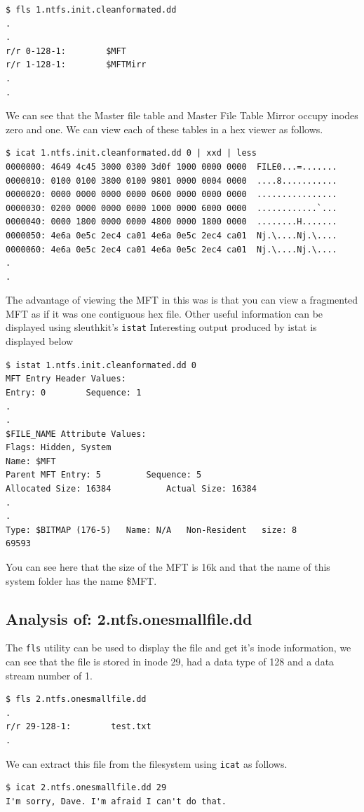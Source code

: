 \documentclass[a4paper,
    11pt,
    normalheadings,
    parindent,
    UKenglish,
    abstracton,
    ]{scrartcl}
\begin{document}
\begin{verbatim}
$ fls 1.ntfs.init.cleanformated.dd
.
.
r/r 0-128-1:        $MFT
r/r 1-128-1:        $MFTMirr
.
.
\end{verbatim}
We can see that the Master file table and Master File Table Mirror occupy inodes zero and one. We can view each of these tables in a hex viewer as follows.
\begin{verbatim}
$ icat 1.ntfs.init.cleanformated.dd 0 | xxd | less
0000000: 4649 4c45 3000 0300 3d0f 1000 0000 0000  FILE0...=.......
0000010: 0100 0100 3800 0100 9801 0000 0004 0000  ....8...........
0000020: 0000 0000 0000 0000 0600 0000 0000 0000  ................
0000030: 0200 0000 0000 0000 1000 0000 6000 0000  ............`...
0000040: 0000 1800 0000 0000 4800 0000 1800 0000  ........H.......
0000050: 4e6a 0e5c 2ec4 ca01 4e6a 0e5c 2ec4 ca01  Nj.\....Nj.\....
0000060: 4e6a 0e5c 2ec4 ca01 4e6a 0e5c 2ec4 ca01  Nj.\....Nj.\....
.
.
\end{verbatim}
The advantage of viewing the MFT in this was is that you can view a fragmented MFT as if it was one contiguous hex file. Other useful information can be displayed using sleuthkit's \texttt{istat}
Interesting output produced by istat is displayed below
\begin{verbatim}
$ istat 1.ntfs.init.cleanformated.dd 0
MFT Entry Header Values:
Entry: 0        Sequence: 1
.
.
$FILE_NAME Attribute Values:
Flags: Hidden, System
Name: $MFT
Parent MFT Entry: 5         Sequence: 5
Allocated Size: 16384           Actual Size: 16384
.
.
Type: $BITMAP (176-5)   Name: N/A   Non-Resident   size: 8
69593
\end{verbatim}
You can see here that the size of the MFT is 16k and that the name of this system folder has the name \$MFT.

\subsection{Analysis of: 2.ntfs.onesmallfile.dd}
The \texttt{fls} utility can be used to display the file and get it's inode information, we can see that the file is stored in inode 29, had a data type of 128 and a data stream number of 1.

\begin{verbatim}
$ fls 2.ntfs.onesmallfile.dd
.
r/r 29-128-1:        test.txt
.
\end{verbatim}
We can extract this file from the filesystem using \texttt{icat} as follows.
\begin{verbatim}
$ icat 2.ntfs.onesmallfile.dd 29
I'm sorry, Dave. I'm afraid I can't do that.
\end{verbatim}
\end{document}
